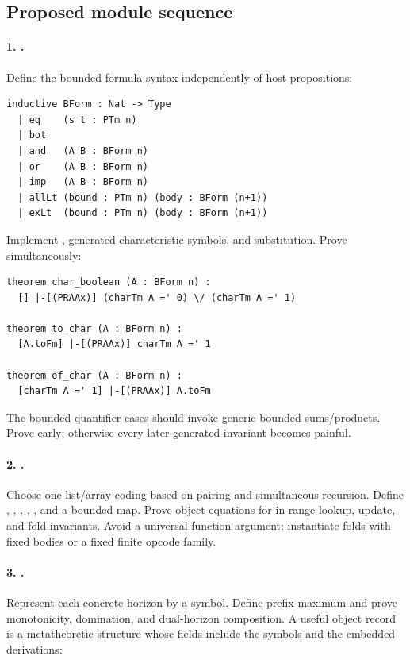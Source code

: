 \subsection{Proposed module sequence}

\paragraph{1. .}
Define the bounded formula syntax independently of host propositions:

\begin{lstlisting}
inductive BForm : Nat -> Type
  | eq    (s t : PTm n)
  | bot
  | and   (A B : BForm n)
  | or    (A B : BForm n)
  | imp   (A B : BForm n)
  | allLt (bound : PTm n) (body : BForm (n+1))
  | exLt  (bound : PTm n) (body : BForm (n+1))
\end{lstlisting}

Implement , generated characteristic symbols, and substitution.  Prove
simultaneously:

\begin{lstlisting}
theorem char_boolean (A : BForm n) :
  [] |-[(PRAAx)] (charTm A =' 0) \/ (charTm A =' 1)

theorem to_char (A : BForm n) :
  [A.toFm] |-[(PRAAx)] charTm A =' 1

theorem of_char (A : BForm n) :
  [charTm A =' 1] |-[(PRAAx)] A.toFm
\end{lstlisting}

The bounded quantifier cases should invoke generic bounded sums/products.  Prove
 early; otherwise every later generated invariant becomes painful.

\paragraph{2. .}
Choose one list/array coding based on pairing and simultaneous recursion.  Define
, , , , , and a bounded map.
Prove object equations for in-range lookup, update, and fold invariants.  Avoid a
universal function argument: instantiate folds with fixed bodies or a fixed finite
opcode family.

\paragraph{3. .}
Represent each concrete horizon by a  symbol.  Define prefix maximum and prove
monotonicity, domination, and dual-horizon composition.  A useful object record is a
metatheoretic structure whose fields include the symbols and the embedded derivations:

